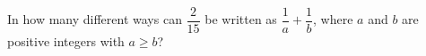 In how many different ways can $\dfrac{2}{15}$ be written as $\dfrac{1}{a}+\dfrac{1}{b}$, where $a$ and $b$ are positive integers with $a\ge b$?
